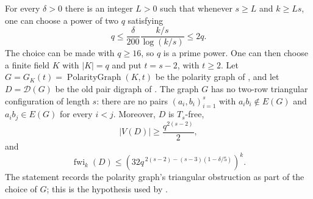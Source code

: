 \begin{lemma}
For every $\delta>0$ there is an integer $L>0$ such that whenever
$s\geq L$ and $k\geq Ls$, one can choose a power of two $q$ satisfying
\[
 q\leq\frac{\delta}{200}\frac{k/s}{\log(k/s)}\leq2q.
\]
The choice can be made with $q\geq16$, so $q$ is a prime power.  One can
then choose a finite field $K$ with $|K|=q$ and put $t=s-2$, with
$t\geq2$.  Let
$G=G_K(t)=\operatorname{PolarityGraph}(K,t)$ be the polarity graph of
, and let $D=\mathcal D(G)$ be the old pair digraph
of .  The graph $G$ has no two-row triangular
configuration of length $s$: there are no pairs $(a_i,b_i)_{i=1}^s$ with
$a_i b_i\notin E(G)$ and $a_i b_j\in E(G)$ for every $i<j$.  Moreover,
$D$ is $T_s$-free,
\[
 |V(D)|\geq\frac{q^{2(s-2)}}2,
\]
and
\[
 \operatorname{fwi}_k(D)\leq
 \left(32q^{\,2(s-2)-(s-3)(1-\delta/5)}\right)^k.
\]
The statement records the polarity graph's triangular obstruction as part
of the choice of $G$; this is the hypothesis used by
.
\end{lemma}
